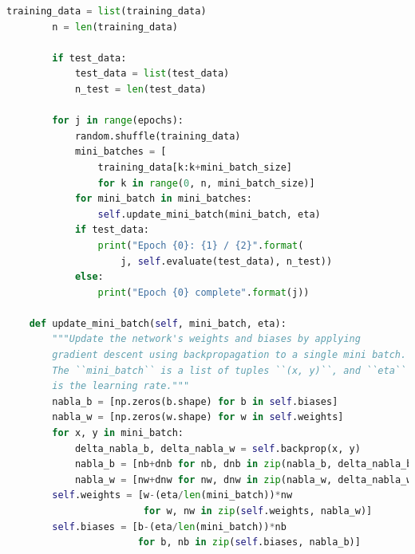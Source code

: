 \begin{lstlisting}[caption={network.py (Python 3.7.1)},label={lst:network.py}, language=Python]
        training_data = list(training_data)
        n = len(training_data)

        if test_data:
            test_data = list(test_data)
            n_test = len(test_data)

        for j in range(epochs):
            random.shuffle(training_data)
            mini_batches = [
                training_data[k:k+mini_batch_size]
                for k in range(0, n, mini_batch_size)]
            for mini_batch in mini_batches:
                self.update_mini_batch(mini_batch, eta)
            if test_data:
                print("Epoch {0}: {1} / {2}".format(
                    j, self.evaluate(test_data), n_test))
            else:
                print("Epoch {0} complete".format(j))

    def update_mini_batch(self, mini_batch, eta):
        """Update the network's weights and biases by applying
        gradient descent using backpropagation to a single mini batch.
        The ``mini_batch`` is a list of tuples ``(x, y)``, and ``eta``
        is the learning rate."""
        nabla_b = [np.zeros(b.shape) for b in self.biases]
        nabla_w = [np.zeros(w.shape) for w in self.weights]
        for x, y in mini_batch:
            delta_nabla_b, delta_nabla_w = self.backprop(x, y)
            nabla_b = [nb+dnb for nb, dnb in zip(nabla_b, delta_nabla_b)]
            nabla_w = [nw+dnw for nw, dnw in zip(nabla_w, delta_nabla_w)]
        self.weights = [w-(eta/len(mini_batch))*nw
                        for w, nw in zip(self.weights, nabla_w)]
        self.biases = [b-(eta/len(mini_batch))*nb
                       for b, nb in zip(self.biases, nabla_b)]


\end{lstlisting}
